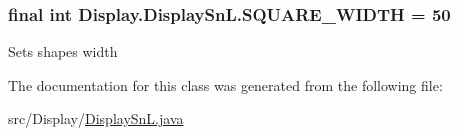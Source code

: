 \subsubsection[{S\+Q\+U\+A\+R\+E\+\_\+\+W\+I\+D\+T\+H}]{\setlength{\rightskip}{0pt plus 5cm}final int Display.\+Display\+Sn\+L.\+S\+Q\+U\+A\+R\+E\+\_\+\+W\+I\+D\+T\+H = 50\hspace{0.3cm}{\ttfamily [static]}}\label{class_display_1_1_display_sn_l_acac8d594916c09aae69657f94c3e766d}
Sets shape\textquotesingle{}s width 

The documentation for this class was generated from the following file\+:\begin{DoxyCompactItemize}
\item 
src/\+Display/\hyperlink{_display_sn_l_8java}{Display\+Sn\+L.\+java}\end{DoxyCompactItemize}
